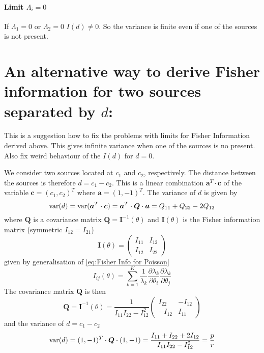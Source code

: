 \paragraph*{Limit $\Lambda_i=0$}
If $\Lambda_1=0$ or $\Lambda_2=0$ $I(d)\neq0$. So the variance is finite even if one of the sources is not present.


\section{An alternative way to derive Fisher information for two sources separated by $d$:}
\label{sec:Appendix FI alternative}
This is a suggestion how to fix the problems with limits for Fisher Information derived above. This gives infinite variance when one of the sources is no present. Also fix weird behaviour of the $I(d)$ for $d=0$. 

We consider two sources located at $c_1$ and $c_2$, respectively. The distance between the sources is therefore $d=c_1-c_2$. This is a linear combination $\bm{a}^T\cdot\bm{c}$ of the variable $\bm{c}=(c_1,c_2)^T$ where $\bm{a}=(1,-1)^T$. The variance of $d$ is given by 
%
\begin{equation}
	\mathrm{var}(d)=\mathrm{var}(\bm{a}^T\cdot\bm{c})=\bm{a}^T\cdot\bm{Q}\cdot\bm{a}=Q_{11}+Q_{22}-2Q_{12}
\end{equation}
%
where $\bm{Q}$ is a covariance matrix $\bm{Q}=\bm{I}^{-1}(\theta)$ and $\bm{I}(\theta)$ is the Fisher information matrix (symmetric
$I_{12}=I_{21}$)
%
\begin{equation}
	\bm{I}(\theta)=\left(
	\begin{array}{cc}
		I_{11} & I_{12}\\
		I_{12} & I_{22}
	\end{array}\right)
\end{equation}
%
given by generalisation of \autoref{eq:Fisher Info for Poisson}
%
\begin{equation}
	I_{ij}(\theta)=\sum_{k=1}^K\frac{1}{\lambda_k}\frac{\partial\lambda_k}{\partial\theta_i}\frac{\partial\lambda_k}{\partial\theta_j}
	\label{eq:Fisher Info gerneral lambda}
\end{equation}
%
The covariance matrix $\bm{Q}$ is then 
%
\begin{equation}
	\bm{Q}=\bm{I}^{-1}(\theta)=\frac{1}{I_{11}I_{22}-I_{12}^2}\left(
	\begin{array}{cc}
		I_{22} & -I_{12}\\
		-I_{12} & I_{11}
	\end{array}\right)
\end{equation}
%
and the variance of $d=c_1-c_2$ 
%
\begin{equation}
	\mathrm{var}(d)=(1,-1)^T\cdot\bm{Q}\cdot(1,-1)=\frac{I_{11}+I_{22}+2I_{12}}{I_{11}I_{22}-I_{12}^2}=\frac{p}{r}
	\label{eq:variance alternative}
\end{equation}

